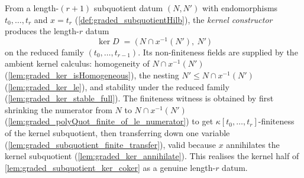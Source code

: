 \begin{definition}

  \label{def:graded_subquotientDatum_ker}
  From a length-\((r+1)\) subquotient datum \((N, N')\) with endomorphisms
  \(t_0, \dots, t_r\) and \(x = t_r\) (\cref{def:graded_subquotientHilb}), the
  \emph{kernel constructor} produces the length-\(r\) datum
  \[
    \ker D \;=\; \bigl(\,N \cap x^{-1}(N'),\ N'\,\bigr)
  \]
  on the reduced family \((t_0, \dots, t_{r-1})\). Its
  non-finiteness fields are supplied by the ambient kernel calculus: homogeneity of
  \(N \cap x^{-1}(N')\) (\cref{lem:graded_ker_isHomogeneous}), the nesting
  \(N' \le N \cap x^{-1}(N')\) (\cref{lem:graded_ker_le}), and stability under the
  reduced family (\cref{lem:graded_ker_stable_full}). The finiteness witness
  is obtained by first shrinking the numerator from \(N\) to
  \(N \cap x^{-1}(N')\) (\cref{lem:graded_polyQuot_finite_of_le_numerator}) to get
  \(\kappa[t_0, \dots, t_r]\)-finiteness of the kernel subquotient, then transferring
  down one variable (\cref{lem:graded_subquotient_finite_transfer}), valid because
  \(x\) annihilates the kernel subquotient (\cref{lem:graded_ker_annihilate}). This
  realises the kernel half of \cref{lem:graded_subquotient_ker_coker} as a genuine
  length-\(r\) datum.
\end{definition}

